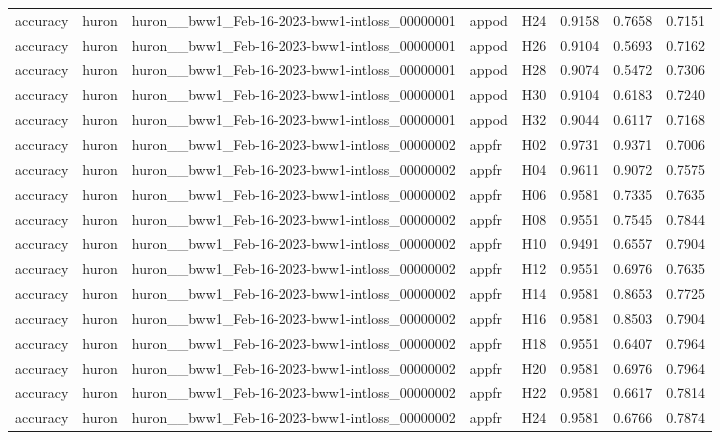 \begin{table}[tbp]
\begin{tabular}{lllllrrr}
accuracy & huron & huron\_\_bww1\_Feb-16-2023-bww1-intloss\_00000001 & appod & H24 & 0.9158 & 0.7658 & 0.7151 \\
accuracy & huron & huron\_\_bww1\_Feb-16-2023-bww1-intloss\_00000001 & appod & H26 & 0.9104 & 0.5693 & 0.7162 \\
accuracy & huron & huron\_\_bww1\_Feb-16-2023-bww1-intloss\_00000001 & appod & H28 & 0.9074 & 0.5472 & 0.7306 \\
accuracy & huron & huron\_\_bww1\_Feb-16-2023-bww1-intloss\_00000001 & appod & H30 & 0.9104 & 0.6183 & 0.7240 \\
accuracy & huron & huron\_\_bww1\_Feb-16-2023-bww1-intloss\_00000001 & appod & H32 & 0.9044 & 0.6117 & 0.7168 \\
accuracy & huron & huron\_\_bww1\_Feb-16-2023-bww1-intloss\_00000002 & appfr & H02 & 0.9731 & 0.9371 & 0.7006 \\
accuracy & huron & huron\_\_bww1\_Feb-16-2023-bww1-intloss\_00000002 & appfr & H04 & 0.9611 & 0.9072 & 0.7575 \\
accuracy & huron & huron\_\_bww1\_Feb-16-2023-bww1-intloss\_00000002 & appfr & H06 & 0.9581 & 0.7335 & 0.7635 \\
accuracy & huron & huron\_\_bww1\_Feb-16-2023-bww1-intloss\_00000002 & appfr & H08 & 0.9551 & 0.7545 & 0.7844 \\
accuracy & huron & huron\_\_bww1\_Feb-16-2023-bww1-intloss\_00000002 & appfr & H10 & 0.9491 & 0.6557 & 0.7904 \\
accuracy & huron & huron\_\_bww1\_Feb-16-2023-bww1-intloss\_00000002 & appfr & H12 & 0.9551 & 0.6976 & 0.7635 \\
accuracy & huron & huron\_\_bww1\_Feb-16-2023-bww1-intloss\_00000002 & appfr & H14 & 0.9581 & 0.8653 & 0.7725 \\
accuracy & huron & huron\_\_bww1\_Feb-16-2023-bww1-intloss\_00000002 & appfr & H16 & 0.9581 & 0.8503 & 0.7904 \\
accuracy & huron & huron\_\_bww1\_Feb-16-2023-bww1-intloss\_00000002 & appfr & H18 & 0.9551 & 0.6407 & 0.7964 \\
accuracy & huron & huron\_\_bww1\_Feb-16-2023-bww1-intloss\_00000002 & appfr & H20 & 0.9581 & 0.6976 & 0.7964 \\
accuracy & huron & huron\_\_bww1\_Feb-16-2023-bww1-intloss\_00000002 & appfr & H22 & 0.9581 & 0.6617 & 0.7814 \\
accuracy & huron & huron\_\_bww1\_Feb-16-2023-bww1-intloss\_00000002 & appfr & H24 & 0.9581 & 0.6766 & 0.7874 \\

\end{tabular}
\end{table}
